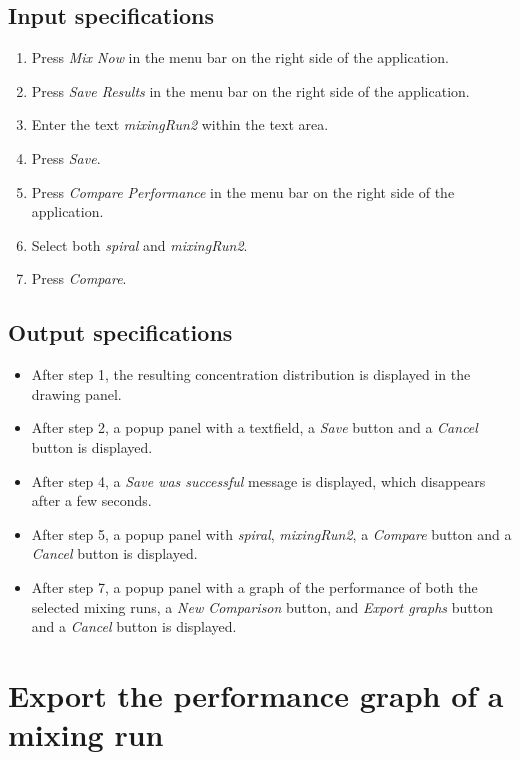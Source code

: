 \subsection*{Input specifications}
\begin{enumerate}
\item Press \emph{Mix Now} in the menu bar on the right side of the application.
\item Press \emph{Save Results} in the menu bar on the right side of the application.
\item Enter the text \emph{mixingRun2} within the text area.
\item Press \emph{Save}.
\item Press \emph{Compare Performance} in the menu bar on the right side of the application.
\item Select both \emph{spiral} and \emph{mixingRun2}.
\item Press \emph{Compare}.
\end{enumerate}

\subsection*{Output specifications}
\begin{itemize}
\item After step 1, the resulting concentration distribution is displayed in the drawing panel.
\item After step 2, a popup panel with a textfield, a \emph{Save} button and a \emph{Cancel} button is displayed.
\item After step 4, a \emph{Save was successful} message is displayed, which disappears after a few seconds.
\item After step 5, a popup panel with \emph{spiral}, \emph{mixingRun2}, a \emph{Compare} button and a \emph{Cancel} button is displayed.
\item After step 7, a popup panel with a graph of the performance of both the selected mixing runs, a \emph{New Comparison} button, and \emph{Export graphs} button and a \emph{Cancel} button is displayed.
\end{itemize}

\section{Export the performance graph of a mixing run}

